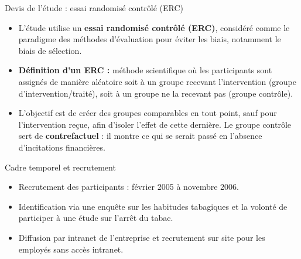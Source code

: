 \documentclass[aspectratio=169,xcolor=dvipsnames]{beamer}
\begin{document}
\begin{frame}{Devis de l'étude : essai randomisé contrôlé (ERC)}
    \begin{itemize}
        \item L'étude utilise un \textbf{essai randomisé contrôlé (ERC)}, considéré comme le paradigme des méthodes d'évaluation pour éviter les biais, notamment le biais de sélection.
        \item \textbf{Définition d'un ERC :} méthode scientifique où les participants sont assignés de manière aléatoire soit à un groupe recevant l'intervention (groupe d'intervention/traité), soit à un groupe ne la recevant pas (groupe contrôle).
        \item L'objectif est de créer des groupes comparables en tout point, sauf pour l'intervention reçue, afin d'isoler l'effet de cette dernière. Le groupe contrôle sert de \textbf{contrefactuel} : il montre ce qui se serait passé en l'absence d'incitations financières.
    \end{itemize}
    \begin{block}{Cadre temporel et recrutement}
        \begin{itemize}
            \item Recrutement des participants : février 2005 à novembre 2006.
            \item Identification via une enquête sur les habitudes tabagiques et la volonté de participer à une étude sur l'arrêt du tabac.
            \item Diffusion par intranet de l'entreprise et recrutement sur site pour les employés sans accès intranet.
        \end{itemize}
    \end{block}
\end{frame}
\end{document}
